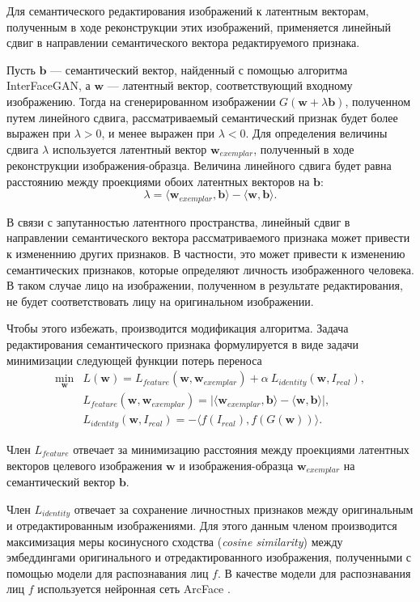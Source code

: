 Для семантического редактирования изображений к латентным векторам, полученным в ходе реконструкции этих изображений, применяется линейный сдвиг в направлении семантического вектора редактируемого признака.

Пусть $\mathbf b$ --- семантический вектор, найденный с помощью алгоритма InterFaceGAN, а $\mathbf w$ --- латентный вектор, соответствующий входному изображению.
Тогда на сгенерированном изображении $G(\mathbf w + \lambda \mathbf b)$, полученном путем линейного сдвига, рассматриваемый семантический признак будет более выражен при $\lambda > 0$, и менее выражен при $\lambda  < 0$.
Для определения величины сдвига $\lambda$ используется латентный вектор $\mathbf w_{exemplar}$, полученный в ходе реконструкции изображения-образца. 
Величина линейного сдвига будет равна расстоянию между проекциями обоих латентных векторов на $\mathbf b$: 
$$\lambda = \langle \mathbf w_{exemplar}, \mathbf b \rangle - \langle \mathbf w, \mathbf b \rangle .$$

В связи с запутанностью латентного пространства, линейный сдвиг в направлении семантического вектора рассматриваемого признака может привести к измененнию других признаков. 
В частности, это может привести к изменению семантических признаков, которые определяют личность изображенного человека. 
В таком случае лицо на изображении, полученном в результате редактирования, не будет соответствовать лицу на оригинальном изображении.

Чтобы этого избежать, производится модификация алгоритма. 
Задача редактирования семантического признака формулируется в виде задачи минимизации следующей функции потерь переноса
\begin{align*}
\min_{\mathbf w} &L(\mathbf w) = L_{feature}(\mathbf w, \mathbf w_{exemplar}) + \alpha~L_{identity}(\mathbf w, I_{real}), \\
&L_{feature}(\mathbf w, \mathbf w_{exemplar}) = \lvert \langle \mathbf w_{exemplar}, \mathbf b \rangle - \langle \mathbf w, \mathbf b \rangle \rvert,\\
&L_{identity}(\mathbf w, I_{real}) = - \langle f(I_{real}), f(G(\mathbf w)) \rangle.
\end{align*}

Член $L_{feature}$ отвечает за минимизацию расстояния между проекциями латентных векторов целевого изображения $\mathbf w$ и изображения-образца $\mathbf w_{exemplar}$ на семантический вектор $\mathbf b$.

Член $L_{identity}$ отвечает за сохранение личностных признаков между оригинальным и отредактированным изображениями. Для этого данным членом производится максимизация меры косинусного сходства (\emph{cosine similarity}) между эмбеддингами оригинального и отредактированного изображения, полученными с помощью модели для распознавания лиц $f$.
В качестве модели для распознавания лиц $f$ используется нейронная сеть ArcFace \cite{deng2018arcface}.

